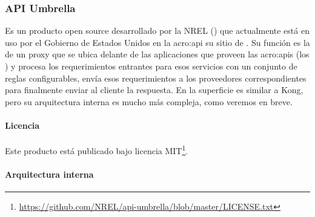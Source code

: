 \subsubsection{API Umbrella}
\label{soa:tecnologias:api-umbrella}

Es un producto open source desarrollado por la NREL () que actualmente está en uso por el Gobierno de Estados Unidos en la \gls{acro:api} su sitio de . Su función es la de un proxy que se ubica delante de las aplicaciones que proveen las \glspl{acro:api} (los ) y procesa los requerimientos entrantes para esos servicios con un conjunto de reglas configurables, envía esos requerimientos a los proveedores correspondientes para finalmente enviar al cliente la respuesta. En la superficie es similar a Kong, pero su arquitectura interna es mucho más compleja, como veremos en breve.

\paragraph{Licencia}

Este producto está publicado bajo licencia MIT\footnote{\url{https://github.com/NREL/api-umbrella/blob/master/LICENSE.txt}}.

\paragraph{Arquitectura interna}

